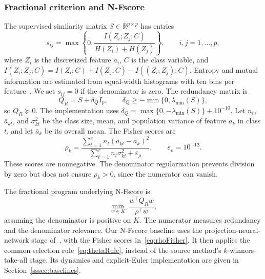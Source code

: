 \documentclass[]{interact}
\theoremstyle{plain}
\theoremstyle{definition}
\theoremstyle{remark}
\newcommand{\R}{\mathbb{R}}
\begin{document}
\subsubsection{Fractional criterion and N-Fscore}\label{ssec:wang}\label{sssec:wang-inputs}\label{sssec:nfscore}
The supervised similarity matrix $S\in\R^{p\times p}$ has entries
\begin{equation}\label{eq:simMI}
s_{ij}=\max\left\{0,\frac{I(Z_i;Z_j;C)}{H(Z_i)+H(Z_j)}\right\},\qquad i,j=1,\ldots,p,
\end{equation}
where $Z_i$ is the discretized feature $a_i$, $C$ is the class variable, and $I(Z_i;Z_j;C)=I(Z_i;C)+I(Z_j;C)-I((Z_i,Z_j);C)$. Entropy and mutual information are estimated from equal-width histograms with ten bins per feature~\citep{brown2012}. We set $s_{ij}=0$ if the denominator is zero. The redundancy matrix is
\begin{equation}\label{eq:matrixQ}
Q_R=S+\delta_QI_p,\qquad \delta_Q\ge-\min\{0,\lambda_{\min}(S)\},
\end{equation}
so $Q_R\succeq0$. The implementation uses $\delta_Q=\max\{0,-\lambda_{\min}(S)\}+10^{-10}$. Let $n_t$, $\bar a_{kt}$, and $\sigma_{kt}^2$ be the class size, mean, and population variance of feature $a_k$ in class $t$, and let $\bar a_k$ be its overall mean. The Fisher scores are
\begin{equation}\label{eq:rhoFisher}
\rho_k=\frac{\sum_{t=1}^r n_t(\bar a_{kt}-\bar a_k)^2}{\sum_{t=1}^r n_t\sigma_{kt}^2+\varepsilon_\rho},\qquad \varepsilon_\rho=10^{-12}.
\end{equation}
These scores are nonnegative. The denominator regularization prevents division by zero but does not ensure $\rho_k>0$, since the numerator can vanish.

The fractional program underlying N-Fscore is
\begin{equation}\label{eq:wangOrig}
\min_{w\in K}\ \frac{w^{\top}Q_Rw}{\rho^{\top}w},
\end{equation}
assuming the denominator is positive on $K$. The numerator measures redundancy and the denominator relevance. Our N-Fscore baseline uses the projection-neural-network stage of~\citep{wang2021fractional}, with the Fisher scores in~\eqref{eq:rhoFisher}. It then applies the common selection rule~\eqref{eq:thetaRule}, instead of the source method's $k$-winners-take-all stage. Its dynamics and explicit-Euler implementation are given in Section~\ref{sssec:baselines}.
\end{document}
